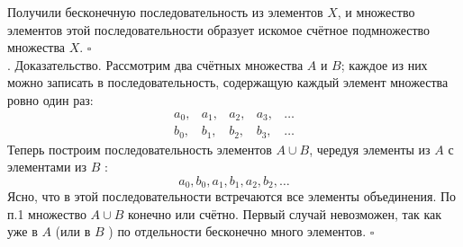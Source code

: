 \documentclass[a4paper]{article}
\newcommand{\qed}{\hfill$\square$}
\begin{document}
\indent Получили бесконечную последовательность из элементов $X$, и множество элементов этой последовательности образует искомое счётное подмножество множества $X$. \qed\\[2mm]
. Доказательство. Рассмотрим два счётных множества $A$ и $B$; каждое из них можно записать в последовательность, содержащую каждый элемент множества ровно один раз:
$$
\begin{array}{lllll}
a_{0}, & a_{1}, & a_{2}, & a_{3}, & \ldots \\
b_{0}, & b_{1}, & b_{2}, & b_{3}, & \ldots
\end{array}
$$
\indent Теперь построим последовательность элементов $A \cup B$, чередуя элементы из $A$ с элементами из $B$ :
$$
a_{0}, b_{0}, a_{1}, b_{1}, a_{2}, b_{2}, \ldots
$$
\indent Ясно, что в этой последовательности встречаются все элементы объединения. По п.1 множество $A \cup B$ конечно или счётно. Первый случай невозможен, так как уже в $A$ (или в $B$ ) по отдельности бесконечно много элементов. \qed
\end{document}
